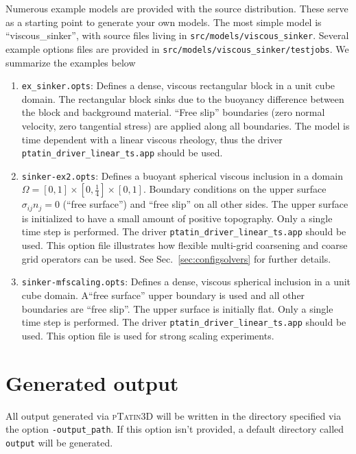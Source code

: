 \documentclass[paper=a4, fontsize=11pt,twoside]{scrartcl}
\newcommand{\ptat}{{{\textsc{pTatin3D}}}}
\newcommand{\unix}[1]{\texttt{\footnotesize #1}}
\begin{document}
{{Numerous example models are provided with the source distribution. These serve as a starting point to generate your own models. The most simple model is ``viscous\_sinker'', with source files living in \unix{src/models/viscous\_sinker}. Several example options files are provided in \unix{src/models/viscous\_sinker/testjobs}. We summarize the examples below
\begin{enumerate}
  \item \texttt{ex\_sinker.opts}: Defines a dense, viscous rectangular block in a unit cube domain. The rectangular block sinks due to the buoyancy difference between the block and background material. ``Free slip'' boundaries (zero normal velocity, zero tangential stress) are applied along all boundaries. The model is time dependent with a linear viscous rheology, thus the driver \unix{ptatin\_driver\_linear\_ts.app} should be used.

  \item \texttt{sinker-ex2.opts}: Defines a buoyant spherical viscous inclusion in a domain $\Omega = [0,1] \times [0,\tfrac{1}{4}] \times [0,1]$. Boundary conditions on the upper surface $\sigma_{ij}n_j=0$ (``free surface'') and ``free slip'' on all other sides. The upper surface is initialized to have a small amount of positive topography. Only a single time step is performed. The driver \unix{ptatin\_driver\_linear\_ts.app} should be used. This option file illustrates how flexible multi-grid coarsening and coarse grid operators can be used. See Sec.~\ref{sec:configsolvers} for further details.

  \item \texttt{sinker-mfscaling.opts}: Defines a dense, viscous spherical inclusion in a unit cube domain. A``free surface'' upper boundary is used and all other boundaries are ``free slip''. The upper surface is initially flat. Only a single time step is performed. The driver \unix{ptatin\_driver\_linear\_ts.app} should be used. This option file is used for strong scaling experiments.
\end{enumerate}

\newpage
\section{Generated output}
All output generated via {\ptat} will be written in the directory specified via the option \unix{-output\_path}. If this option isn't provided, a default directory called \texttt{output} will be generated.

}}
\end{document}
